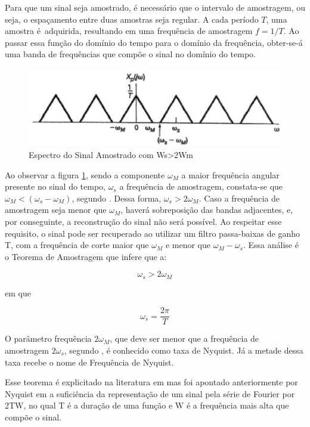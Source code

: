 Para que um sinal seja amostrado, é necessário que o intervalo de amostragem, ou seja, o espaçamento entre duas amostras seja regular. A cada período $T$, uma amostra é adquirida, resultando em uma frequência de amostragem $f = 1/T$.
Ao passar essa função do domínio do tempo para o domínio da frequência, obter-se-á uma banda de frequências que compõe o sinal no domínio do tempo. 

\begin{figure}[h]
	\centering
    \includegraphics[scale=0.5]{figuras/fig03.eps}
	\caption{Espectro do Sinal Amostrado com Ws>2Wm}
	\label{fig03}
\end{figure}

Ao observar a figura \ref{fig03}, sendo a componente $\omega_M$ a maior frequência angular presente no sinal do tempo, $\omega_s$ a frequência de amostragem, constata-se que $\omega_M<(\omega_s-\omega_M)$, segundo \cite{oppenheim2010sinais}. Dessa forma, $\omega_s>2\omega_M$. Caso a frequência de amostragem seja menor que $\omega_M$, haverá sobreposição das bandas adjacentes, e, por conseguinte, a reconstrução do sinal não será possível. Ao respeitar esse requisito, o sinal pode ser recuperado ao utilizar um filtro passa-baixas de ganho T, com a frequência de corte maior que $\omega_M$ e menor que $\omega_M-\omega_s$.
Essa análise é o Teorema de Amostragem que infere que a:

\begin{equation} \label{eq:01}
\omega_s>2\omega_M
\end{equation}

em que

\begin{equation} \label{eq:02}
\omega_s=\frac{2\pi}{T}
\end{equation}

O parâmetro frequência $2\omega_M$, que deve ser menor que a frequência de amostragem  $2\omega_s$, segundo \cite{oppenheim2010sinais}, é conhecido como taxa de Nyquist. Já a metade dessa taxa recebe o nome de Frequência de Nyquist.
\par
Esse teorema é explicitado na literatura em \cite{Shannon} mas foi apontado anteriormente por Nyquist em \cite{nyquist} a suficiência da representação de um sinal pela série de Fourier por 2TW, no qual T é a duração de uma função e W é a frequência mais alta que compõe o sinal.

